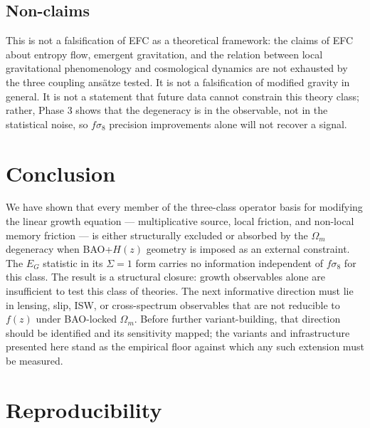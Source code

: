 \documentclass[11pt,a4paper]{article}
\begin{document}
\subsection{Non-claims}

This is not a falsification of EFC as a theoretical framework: the claims of EFC about entropy flow, emergent gravitation, and the relation between local gravitational phenomenology and cosmological dynamics are not exhausted by the three coupling ansätze tested. It is not a falsification of modified gravity in general. It is not a statement that future data cannot constrain this theory class; rather, Phase 3 shows that the degeneracy is in the observable, not in the statistical noise, so $f\sigma_8$ precision improvements alone will not recover a signal.

\section{Conclusion}

We have shown that every member of the three-class operator basis for modifying the linear growth equation --- multiplicative source, local friction, and non-local memory friction --- is either structurally excluded or absorbed by the $\Omega_m$ degeneracy when BAO+$H(z)$ geometry is imposed as an external constraint. The $E_G$ statistic in its $\Sigma=1$ form carries no information independent of $f\sigma_8$ for this class. The result is a structural closure: growth observables alone are insufficient to test this class of theories. The next informative direction must lie in lensing, slip, ISW, or cross-spectrum observables that are not reducible to $f(z)$ under BAO-locked $\Omega_m$. Before further variant-building, that direction should be identified and its sensitivity mapped; the variants and infrastructure presented here stand as the empirical floor against which any such extension must be measured.

\appendix
\section{Reproducibility}
\end{document}
